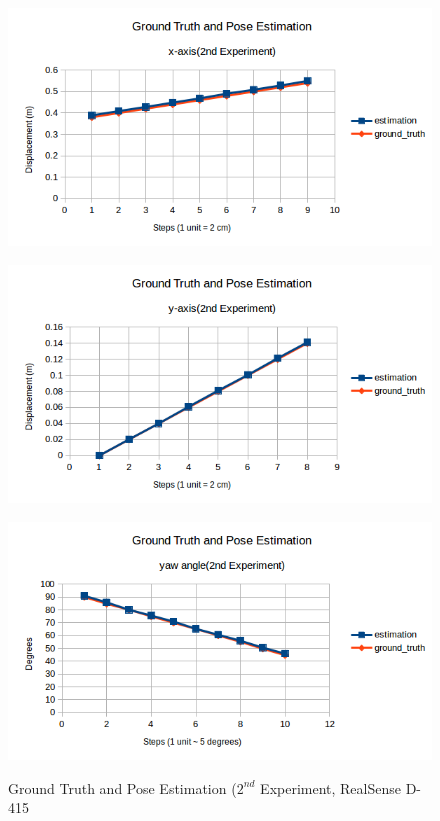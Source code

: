 \begin{figure}[htp]
\begin{center}
{
  \includegraphics[clip,width=0.7\columnwidth]{figures/x_newrealsense.png}
}
\end{center}
\begin{center}
{
  \includegraphics[clip,width=0.7\columnwidth]{figures/y_newrealsense.png}
}
\end{center}

\begin{center}
{
  \includegraphics[clip,width=0.7\columnwidth]{figures/yaw_newrealsense.png}
}
\end{center}
\caption{Ground Truth and Pose Estimation ($2^{nd}$ Experiment, RealSense D-415}
\label{newreal2}
\end{figure}
